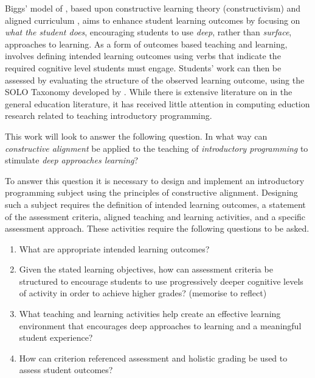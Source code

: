 Biggs' model of \CA \cite{Biggs:1996c,Biggs:2007}, based upon constructive learning theory (constructivism) and aligned curriculum \cite{Cohen:1987}, aims to enhance student learning outcomes by focusing on \emph{what the student does}, encouraging students to use \emph{deep}, rather than \emph{surface}, approaches to learning. As a form of outcomes based teaching and learning, \CA involves defining intended learning outcomes using verbs that indicate the required cognitive level students must engage. Students' work can then be assessed by evaluating the structure of the observed learning outcome, using the SOLO Taxonomy developed by \citet{Biggs:1982}. While there is extensive literature on \CA in the general education literature, it has received little attention in computing eduction research related to teaching introductory programming. 






This work will look to answer the following question. In what way can \emph{constructive alignment} be applied to the teaching of \emph{introductory programming} to stimulate \emph{deep approaches learning}?

To answer this question it is necessary to design and implement an introductory programming subject using the principles of constructive alignment. Designing such a subject requires the definition of intended learning outcomes, a statement of the assessment criteria, aligned teaching and learning activities, and a specific assessment approach. These activities require the following questions to be asked.

\begin{enumerate}
  \item What are appropriate intended learning outcomes?
  \item Given the stated learning objectives, how can assessment criteria be structured to encourage students to use progressively deeper cognitive levels of activity in order to achieve higher grades? (memorise to reflect)
  \item What teaching and learning activities help create an effective learning environment that encourages deep approaches to learning and a meaningful student experience?
  \item How can criterion referenced assessment and holistic grading be used to assess student outcomes?
\end{enumerate}


